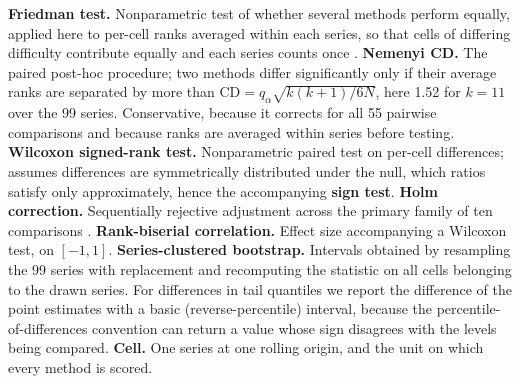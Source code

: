 \documentclass[11pt]{article}
\begin{document}
\textbf{Friedman test.} Nonparametric test of whether several methods perform equally, applied here to per-cell ranks averaged within each series, so that cells of differing difficulty contribute equally and each series counts once \citep{demsar2006}. \textbf{Nemenyi CD.} The paired post-hoc procedure; two methods differ significantly only if their average ranks are separated by more than $\mathrm{CD} = q_\alpha \sqrt{k(k+1)/6N}$, here 1.52 for $k = 11$ over the 99 series. Conservative, because it corrects for all 55 pairwise comparisons and because ranks are averaged within series before testing. \textbf{Wilcoxon signed-rank test.} Nonparametric paired test on per-cell differences; assumes differences are symmetrically distributed under the null, which ratios satisfy only approximately, hence the accompanying \textbf{sign test}. \textbf{Holm correction.} Sequentially rejective adjustment across the primary family of ten comparisons \citep{holm1979}. \textbf{Rank-biserial correlation.} Effect size accompanying a Wilcoxon test, on $[-1, 1]$. \textbf{Series-clustered bootstrap.} Intervals obtained by resampling the 99 series with replacement and recomputing the statistic on all cells belonging to the drawn series. For differences in tail quantiles we report the difference of the point estimates with a basic (reverse-percentile) interval, because the percentile-of-differences convention can return a value whose sign disagrees with the levels being compared. \textbf{Cell.} One series at one rolling origin, and the unit on which every method is scored.
\end{document}
